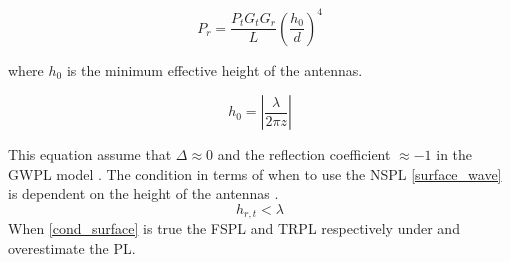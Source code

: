 \begin{equation}
P_r=\frac{P_t G_t G_r }{L}\left(\frac{h_0}{d}\right)^4
\label{surface_wave}
\end{equation}

where $h_0$ is the minimum effective height of the antennas. 

\begin{equation}
h_{0} = \left|\frac{\lambda}{2\pi z}\right|
\label{h_0}
\end{equation}

This equation assume that $\Delta \approx 0$ and the reflection coefficient $\approx -1$ in the GWPL model \cite{Chong}. The condition in terms of when to use the NSPL \eqref{surface_wave} is dependent on the height of the antennas \cite{Chong}.
\begin{equation}
h_{r,t} < \lambda
\label{cond_surface}
\end{equation}
When \eqref{cond_surface} is true the FSPL and TRPL respectively under and overestimate the PL.
